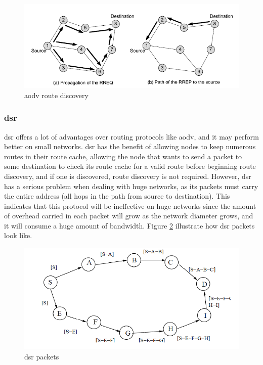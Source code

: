 \begin{figure}[!htb]
    \centering
    \includegraphics[scale=0.6]{images/aodv.png}
    \caption{\acrshort{aodv} route discovery}
    \label{fig:aodv}
\end{figure}

\subsubsection{\acrfull{dsr}}
\acrfull{dsr} offers a lot of advantages over routing protocols like \acrshort{aodv}, and it may perform better on small networks. \acrshort{dsr} has the benefit of allowing nodes to keep numerous routes in their route cache, allowing the node that wants to send a packet to some destination to check its route cache for a valid route before beginning route discovery, and if one is discovered, route discovery is not required. However, \acrshort{dsr} has a serious problem when dealing with huge networks, as its packets must carry the entire address (all hops in the path from source to destination). This indicates that this protocol will be ineffective on huge networks since the amount of overhead carried in each packet will grow as the network diameter grows, and it will consume a huge amount of bandwidth. Figure \ref{fig:dsr} illustrate how \acrshort{dsr} packets look like. \cite{usop2009performance} \cite{johnson2001dsr}

\begin{figure}[!htb]
    \centering
    \includegraphics[scale=0.5]{images/dsr.png}
    \caption{\acrshort{dsr} packets}
    \label{fig:dsr}
\end{figure}

